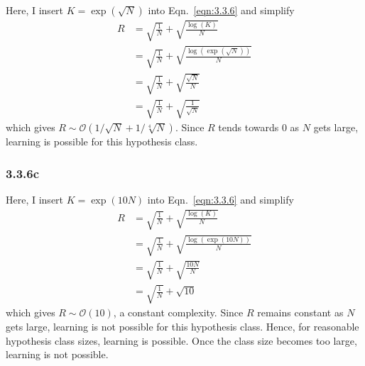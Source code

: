 \documentclass[12pt]{amsart}
\begin{document}
Here, I insert $K = \exp(\sqrt{N})$ into Eqn.~\ref{eqn:3.3.6} and simplify
\begin{equation}
\begin{split}
R & = \sqrt{\frac{1}{N}} + \sqrt{\frac{\log(K)}{N}} \\
& = \sqrt{\frac{1}{N}} + \sqrt{\frac{\log(\exp(\sqrt{N}))}{N}} \\
& = \sqrt{\frac{1}{N}} + \sqrt{\frac{\sqrt{N}}{N}} \\
& = \sqrt{\frac{1}{N}} + \sqrt{\frac{1}{\sqrt{N}}}
\end{split}
\end{equation}
which gives $R {\sim} \mathcal{O}(1/\sqrt{N} + 1/\sqrt[4]{N})$.  Since $R$ tends towards 0 as $N$ gets large, learning is possible for this hypothesis class.

\subsubsection*{3.3.6c}

Here, I insert $K = \exp(10N)$ into Eqn.~\ref{eqn:3.3.6} and simplify
\begin{equation}
\begin{split}
R & = \sqrt{\frac{1}{N}} + \sqrt{\frac{\log(K)}{N}} \\
& = \sqrt{\frac{1}{N}} + \sqrt{\frac{\log(\exp(10N))}{N}} \\
& = \sqrt{\frac{1}{N}} + \sqrt{\frac{10N}{N}} \\ 
& = \sqrt{\frac{1}{N}} + \sqrt{10}
\end{split}
\end{equation}
which gives $R {\sim} \mathcal{O}(10)$, a constant complexity.  Since $R$ remains constant as $N$ gets large, learning is not possible for this hypothesis class.  Hence, for reasonable hypothesis class sizes, learning is possible.  Once the class size becomes too large, learning is not possible.
\end{document}
